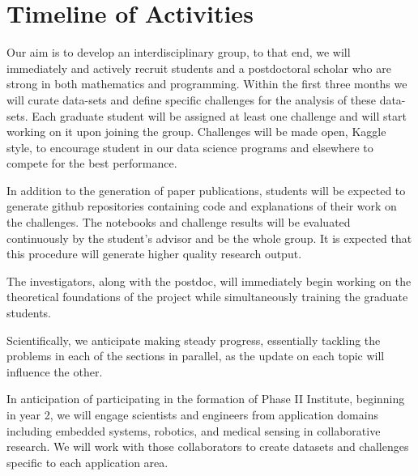 \section{Timeline of Activities}

Our aim is to develop an interdisciplinary group, to that end, we will immediately and actively recruit students and a postdoctoral scholar who are strong in both mathematics and programming. Within the first three months we will curate data-sets and define specific challenges for the analysis of these data-sets. Each graduate student will be assigned at least one challenge and will start working on it upon joining the group. Challenges will be made open, Kaggle style, to encourage student in our data science programs and elsewhere to compete for the best performance.

In addition to the generation of paper publications, students will be expected to generate github repositories containing code and explanations of their work on the challenges. The notebooks and challenge results will be evaluated continuously by the student's advisor and be the whole group. It is expected that this procedure will generate higher quality research output.

The investigators, along with the postdoc, will immediately begin working on the theoretical foundations of the project while simultaneously training the graduate students. 

Scientifically, we anticipate making steady progress, essentially tackling the problems in each of the sections in parallel, as the update on each topic will influence the other. 

In anticipation of participating in the formation of Phase II Institute, beginning in year 2, we will engage scientists and engineers from application domains including embedded systems, robotics, and medical sensing in collaborative research. We will work with those collaborators to create datasets and challenges specific to each application area.